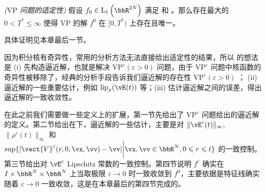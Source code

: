 \begin{theorem}\textit{($\text{VP}$ 问题的适定性)}
    \label{thm:local-wellposedness}
    假设 $f_{0} \in \mathrm{L}_{1}\left(\bbR^{2 N}\right)$ 满足 \supremumf 和 \lipOffVsphere。那么存在最大的 $0<T^{\ast}\leqslant\infty$ 使得 $\text{VP}$ 的解 $ f^{0}$ 在 $[0,T^{\ast})$ 上存在且唯一。
    
    具体证明见本章最后一节。




\end{theorem}




因为积分核有奇异性，常用的分析方法无法直接给出适定性的结果，所以 \cite{HorstClasssicalI} 的想法是 (i) 先构造逼近解，也就是解决 $\text{VP}^\varepsilon  (\varepsilon >0)$ 问题，由于 $\text{VP}^\varepsilon$ 问题中核函数的奇异性被移除了，经典的分析手段告诉我们逼近解的存在性 $\text{VP}^\varepsilon (\varepsilon >0)$ ； (ii) 逼近解的一些重要估计，例如 $\operatorname{lip}_x (\vE(t))$ 等；(iii) 估计逼近解之间的误差，得出逼近解的一致收敛性。

在此之前我们需要做一些定义上的扩展，第一节先给出了 $\text{VP}^\varepsilon$ 问题给出的逼近解的定义。第二节给出在\supremumf 下，逼近解的一些估计，主要是对 $\|\vE^\varepsilon(t)\|_\infty$, $\|\rho^\varepsilon(t)\|_\infty$ 和 $\sup \{|\vect{V}^\varepsilon(r,0,\vx,\vv)-\vv| \bigg|\vx,\vv \in \bbR^N, 0\leqslant r \leqslant t \}$ 的一致控制。第三节给出对 $\vE^\varepsilon$ Lipschitz 常数的一致控制。第四节说明 $f^\varepsilon$ 确实在 $I\times \bbR^N \times \bbR^N $ 上当取极限 $\varepsilon\rightarrow 0 $ 时一致收敛到 $f^0$，主要依据是特征线确实随着 $\varepsilon\rightarrow 0$ 一致收敛，这是在本章最后的第四节完成的。




